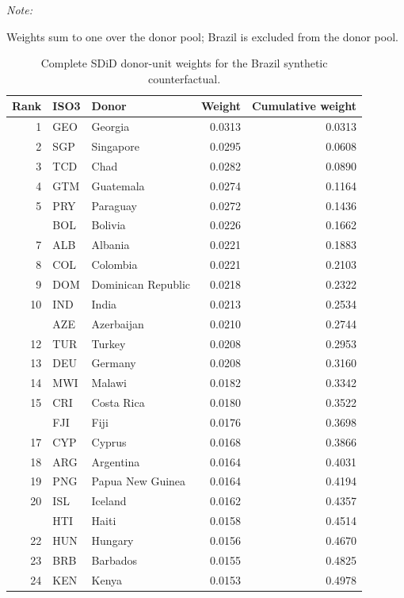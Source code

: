 \documentclass[referee,pdflatex,sn-basic]{sn-jnl}
\theoremstyle{thmstylethree}
\begin{document}
\begin{ThreePartTable}
\begin{TableNotes}
\item \textit{Note: } 
\item Weights sum to one over the donor pool; Brazil is excluded from the donor pool.
\end{TableNotes}
\begin{longtable}[t]{rllrr}
\caption{\label{tab:sdid-unit-weights-complete}Complete SDiD donor-unit weights for the Brazil synthetic counterfactual.}\\
\toprule
Rank & ISO3 & Donor & Weight & Cumulative weight\\
\midrule
1 & GEO & Georgia & 0.0313 & 0.0313\\
2 & SGP & Singapore & 0.0295 & 0.0608\\
3 & TCD & Chad & 0.0282 & 0.0890\\
4 & GTM & Guatemala & 0.0274 & 0.1164\\
5 & PRY & Paraguay & 0.0272 & 0.1436\\
\addlinespace
6 & BOL & Bolivia & 0.0226 & 0.1662\\
7 & ALB & Albania & 0.0221 & 0.1883\\
8 & COL & Colombia & 0.0221 & 0.2103\\
9 & DOM & Dominican Republic & 0.0218 & 0.2322\\
10 & IND & India & 0.0213 & 0.2534\\
\addlinespace
11 & AZE & Azerbaijan & 0.0210 & 0.2744\\
12 & TUR & Turkey & 0.0208 & 0.2953\\
13 & DEU & Germany & 0.0208 & 0.3160\\
14 & MWI & Malawi & 0.0182 & 0.3342\\
15 & CRI & Costa Rica & 0.0180 & 0.3522\\
\addlinespace
16 & FJI & Fiji & 0.0176 & 0.3698\\
17 & CYP & Cyprus & 0.0168 & 0.3866\\
18 & ARG & Argentina & 0.0164 & 0.4031\\
19 & PNG & Papua New Guinea & 0.0164 & 0.4194\\
20 & ISL & Iceland & 0.0162 & 0.4357\\
\addlinespace
21 & HTI & Haiti & 0.0158 & 0.4514\\
22 & HUN & Hungary & 0.0156 & 0.4670\\
23 & BRB & Barbados & 0.0155 & 0.4825\\
24 & KEN & Kenya & 0.0153 & 0.4978\\

\end{longtable}
\end{ThreePartTable}
\end{document}
